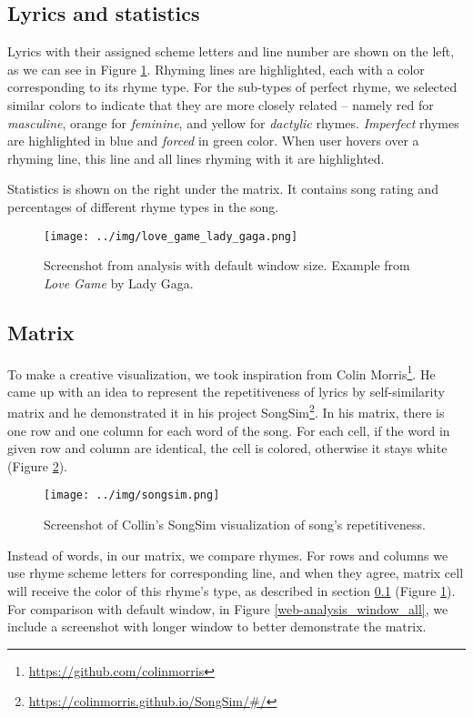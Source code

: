 \subsection{Lyrics and statistics}\label{sec-lyrics_and_stats}
Lyrics with their assigned scheme letters and line number are shown on the left, as we can see in Figure \ref{web-analysis_window5}. Rhyming lines are highlighted, each with a color corresponding to its rhyme type. For the sub-types of perfect rhyme, we selected similar colors to indicate that they are more closely related -- namely red for \textit{masculine}, orange for \textit{feminine}, and yellow for \textit{dactylic} rhymes. \textit{Imperfect} rhymes are highlighted in blue and \textit{forced} in green color. When user hovers over a rhyming line, this line and all lines rhyming with it are highlighted.

Statistics is shown on the right under the matrix. It contains song rating and percentages of different rhyme types in the song.

\begin{figure}[h]\centering
	\texttt{[image: ../img/love\_game\_lady\_gaga.png]}
	\caption[Screenshot from analysis with default window size.]{Screenshot from analysis with default window size. Example from \textit{Love Game} by Lady Gaga.}
	\label{web-analysis_window5}
\end{figure}

\subsection{Matrix}\label{visualization-matrix}
To make a creative visualization, we took inspiration from Colin Morris\footnote{\url{https://github.com/colinmorris}}. He came up with an idea to represent the repetitiveness of lyrics by self-similarity matrix and he demonstrated it in his project SongSim\footnote{\url{https://colinmorris.github.io/SongSim/\#/}}. In his matrix, there is one row and one column for each word of the song. For each cell, if the word in given row and column are identical, the cell is colored, otherwise it stays white (Figure \ref{songsim}).

\begin{figure}[h]\centering
	\texttt{[image: ../img/songsim.png]}
	\caption{Screenshot of Collin's SongSim visualization of song's repetitiveness.}
	\label{songsim}
\end{figure}

Instead of words, in our matrix, we compare rhymes. For rows and columns we use rhyme scheme letters for corresponding line, and when they agree, matrix cell will receive the color of this rhyme's type, as described in section \ref{sec-lyrics_and_stats} (Figure \ref{web-analysis_window5}). For comparison with default window, in Figure \ref{web-analysis_window_all}, we include a screenshot with longer window to better demonstrate the matrix.


